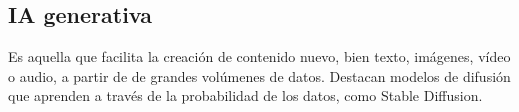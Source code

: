 \subsection{IA generativa}
    Es aquella que facilita la creación de contenido nuevo, bien texto, imágenes, vídeo o audio, a partir de de grandes volúmenes de datos. Destacan modelos de difusión que aprenden a través de la probabilidad de los datos, como Stable Diffusion.

